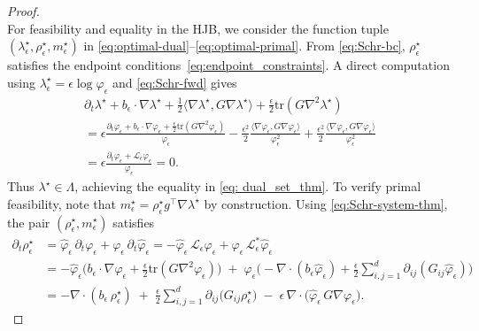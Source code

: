 \documentclass{amsart}
\numberwithin{equation}{section}
\newcommand{\tr}{\mathrm{tr}}
\begin{document}
\begin{proof}
\begin{equation}
\end{equation}
For feasibility and equality in the HJB, we consider the function tuple $(\lambda_{\epsilon}^\star,\rho_{\epsilon}^\star,m_{\epsilon}^\star)$ in \eqref{eq:optimal-dual}--\eqref{eq:optimal-primal}. From \eqref{eq:Schr-bc}, $\rho_{\epsilon}^\star$ satisfies the endpoint conditions~\eqref{eq:endpoint_constraints}. A direct computation using $\lambda_{\epsilon}^\star=\epsilon\log\varphi_{\epsilon}$ and \eqref{eq:Schr-fwd} gives
\begin{multline*}
\partial_t\lambda^\star+b_\epsilon\cdot\nabla\lambda^\star
+\tfrac12\langle\nabla\lambda^\star,G\nabla\lambda^\star\rangle
+\tfrac{\epsilon}{2}\tr(G\nabla^2\lambda^\star) \\
= \epsilon\frac{\partial_t\varphi_{\epsilon}+b_\epsilon\cdot\nabla\varphi_{\epsilon}+\tfrac{\epsilon}{2}\tr(G\nabla^2\varphi_{\epsilon})}{\varphi_{\epsilon}}
-\tfrac{\epsilon^2}{2}\frac{\langle\nabla\varphi_{\epsilon},G\nabla\varphi_{\epsilon}\rangle}{\varphi_{\epsilon}^2}
+\tfrac{\epsilon^2}{2}\frac{\langle\nabla\varphi_{\epsilon},G\nabla\varphi_{\epsilon}\rangle}{\varphi_{\epsilon}^2}
\\= \epsilon\frac{\partial_t\varphi_{\epsilon}+\mathcal L_\epsilon\varphi_{\epsilon}}{\varphi_{\epsilon}}=0.
\end{multline*}
Thus $\lambda^\star\in\Lambda$, achieving the equality in \eqref{eq: dual_set_thm}. To verify primal feasibility, note that $m_{\epsilon}^\star=\rho_{\epsilon}^\star g^\top\nabla\lambda^\star$ by construction. Using \eqref{eq:Schr-system-thm}, the pair $(\rho_{\epsilon}^\star,m_{\epsilon}^\star)$ satisfies
\begin{align*}
\partial_t\rho_{\epsilon}^\star
&= \hat\varphi_{\epsilon}\,\partial_t\varphi_{\epsilon} + \varphi_{\epsilon}\,\partial_t\hat\varphi_{\epsilon}
= -\hat\varphi_{\epsilon}\,\mathcal L_\epsilon\varphi_{\epsilon} + \varphi_{\epsilon}\,\mathcal L_\epsilon^\ast\hat\varphi_{\epsilon} \\
&= -\hat\varphi_{\epsilon}\Big(b_\epsilon\cdot\nabla\varphi_{\epsilon} + \frac{\epsilon}{2}\tr(G\nabla^2\varphi_{\epsilon})\Big)
\;+\;\varphi_{\epsilon}\Big(-\nabla\!\cdot(b_\epsilon\hat\varphi_{\epsilon})+\frac{\epsilon}{2}\sum_{i,j=1}^d\partial_{ij}(G_{ij}\hat\varphi_{\epsilon})\Big) \\
&= -\nabla\!\cdot(b_\epsilon\,\rho_{\epsilon}^\star)
\;+\;\frac{\epsilon}{2}\sum_{i,j=1}^d \partial_{ij}\!\big(G_{ij}\rho_{\epsilon}^\star\big)
\;-\;\epsilon\,\nabla\!\cdot\!\big(\hat\varphi_{\epsilon}\,G\nabla\varphi_{\epsilon}\big).

\end{align*}
\end{proof}
\end{document}
